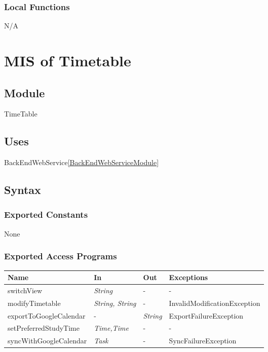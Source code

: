 \documentclass[12pt, titlepage]{article}
\begin{document}
\subsubsection{Local Functions}
N/A




\newpage
\section{MIS of Timetable} \label{TimetableModule}

\subsection{Module}
TimeTable

\subsection{Uses}
BackEndWebService\ref{BackEndWebServiceModule}

\subsection{Syntax}

\subsubsection{Exported Constants}
None

\subsubsection{Exported Access Programs}
\begin{center}
\begin{tabular}{p{4cm} p{3cm} p{3cm} p{3cm}}
\hline
\textbf{Name} & \textbf{In} & \textbf{Out} & \textbf{Exceptions} \\
\hline
switchView & \textit{String} & - & - \\
modifyTimetable&  \textit{String, String} & - & InvalidModificationException \\
exportToGoogleCalendar&  - & \textit{String} &  ExportFailureException \\
setPreferredStudyTime&  \textit{Time,Time} & - & - \\
syncWithGoogleCalendar&  \textit{Task} & - & SyncFailureException \\
\hline
\end{tabular}
\end{center}
\end{document}
